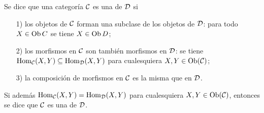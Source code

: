 \documentclass{article}
\numberwithin{equation}{section}
\theoremstyle{definition}
\begin{document}
\begin{definicion}
  Se dice que una categoría $\mathcal{C}$ es una  de
  $\mathcal{D}$ si

  \begin{enumerate}
  \item[1)] los objetos de $\mathcal{C}$ forman una subclase de los objetos de
    $\mathcal{D}$: para todo $X\in \operatorname{Ob}{C}$ se tiene $X\in \operatorname{Ob}{D}$;

  \item[2)] los morfismos en $\mathcal{C}$ son también morfismos en $\mathcal{D}$:
    se tiene $\operatorname{Hom}_\mathcal{C} (X,Y) \subseteq \operatorname{Hom}_\mathcal{D} (X,Y)$ para
    cualesquiera $X,Y \in \operatorname{Ob}(\mathcal{C})$;

  \item[3)] la composición de morfismos en $\mathcal{C}$ es la misma que en
    $\mathcal{D}$.
  \end{enumerate}

  Si además $\operatorname{Hom}_\mathcal{C} (X,Y) = \operatorname{Hom}_\mathcal{D} (X,Y)$ para cualesquiera
  $X,Y \in \operatorname{Ob}(\mathcal{C})$, entonces se dice que $\mathcal{C}$ es una
   de $\mathcal{D}$.
\end{definicion}
\end{document}
